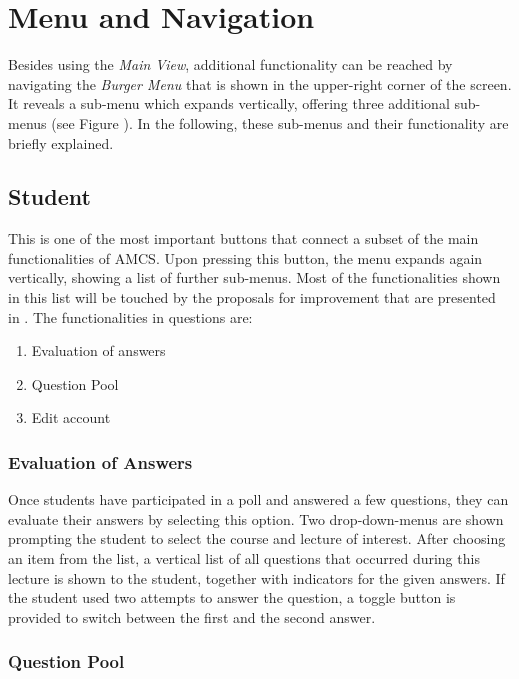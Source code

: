 \section{Menu and Navigation}
Besides using the \emph{Main View}, additional functionality can be reached by navigating the \emph{Burger Menu} that is shown in the upper-right corner of the screen. It reveals a sub-menu which expands vertically, offering three additional sub-menus (see Figure \todosct). In the following, these sub-menus and their functionality are briefly explained.

\subsection{Student}

This is one of the most important buttons that connect a subset of the main functionalities of AMCS. Upon pressing this button, the menu expands again vertically, showing a list of further sub-menus. Most of the functionalities shown in this list will be touched by the proposals for improvement that are presented in . The functionalities in questions are:

\begin{enumerate}
	\item Evaluation of answers
	\item Question Pool
	\item Edit account
\end{enumerate}

\subsubsection{Evaluation of Answers}

Once students have participated in a poll and answered a few questions, they can evaluate their answers by selecting this option. Two drop-down-menus are shown prompting the student to select the course and lecture of interest. 
After choosing an item from the list, a vertical list of all questions that occurred during this lecture is shown to the student, together with indicators for the given answers.
If the student used two attempts to answer the question, a toggle button is provided to switch between the first and the second answer. \todogrf

\subsubsection{Question Pool}

